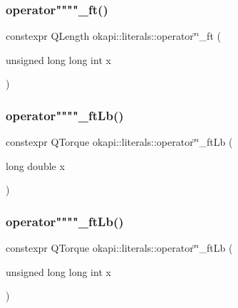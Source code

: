 \mbox{\label{namespaceokapi_1_1literals_a8343123efcfb6bee7df737f7981f4589}} 
\subsubsection{\texorpdfstring{operator""""\_ft()}{operator""\_ft()}\hspace{0.1cm}{\footnotesize\ttfamily [2/2]}}
{\footnotesize\ttfamily constexpr Q\+Length okapi\+::literals\+::operator\char`\"{}\char`\"{}\+\_\+ft (\begin{DoxyParamCaption}\item[{unsigned long long int}]{x }\end{DoxyParamCaption})}

\mbox{\label{namespaceokapi_1_1literals_ae51975f311fd3f3cc34443344f430dec}} 
\subsubsection{\texorpdfstring{operator""""\_ftLb()}{operator""\_ftLb()}\hspace{0.1cm}{\footnotesize\ttfamily [1/2]}}
{\footnotesize\ttfamily constexpr Q\+Torque okapi\+::literals\+::operator\char`\"{}\char`\"{}\+\_\+ft\+Lb (\begin{DoxyParamCaption}\item[{long double}]{x }\end{DoxyParamCaption})}

\mbox{\label{namespaceokapi_1_1literals_a0bb5a987b1cc3e5f511cc5db14d29f8d}} 
\subsubsection{\texorpdfstring{operator""""\_ftLb()}{operator""\_ftLb()}\hspace{0.1cm}{\footnotesize\ttfamily [2/2]}}
{\footnotesize\ttfamily constexpr Q\+Torque okapi\+::literals\+::operator\char`\"{}\char`\"{}\+\_\+ft\+Lb (\begin{DoxyParamCaption}\item[{unsigned long long int}]{x }\end{DoxyParamCaption})}

